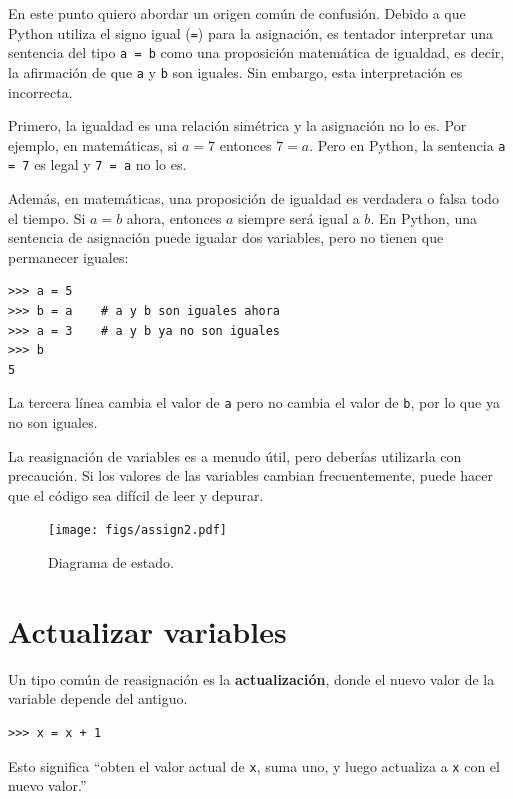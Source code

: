 \documentclass[10pt]{book}
\begin{document}
En este punto quiero abordar un origen común de
confusión.
Debido a que Python utiliza el signo igual ({\tt =}) para la asignación, es
tentador interpretar una sentencia del tipo {\tt a = b} como una
proposición
matemática de igualdad, es decir, la afirmación de que {\tt a} y
{\tt b} son iguales.  Sin embargo, esta interpretación es incorrecta.

Primero, la igualdad es una relación simétrica y la asignación no lo es.  Por
ejemplo, en matemáticas, si $a=7$ entonces $7=a$.  Pero en Python, la
sentencia {\tt a = 7} es legal y {\tt 7 = a} no lo es.

Además, en matemáticas, una proposición de igualdad es verdadera o
falsa todo el tiempo.  Si $a=b$ ahora, entonces $a$ siempre será igual a $b$.
En Python, una sentencia de asignación puede igualar dos variables, pero
no tienen que permanecer iguales:

\begin{verbatim}
>>> a = 5
>>> b = a    # a y b son iguales ahora
>>> a = 3    # a y b ya no son iguales
>>> b
5
\end{verbatim}
%
La tercera línea cambia el valor de {\tt a} pero no cambia el
valor de {\tt b}, por lo que ya no son iguales.

La reasignación de variables es a menudo útil, pero deberías utilizarla
con precaución.  Si los valores de las variables cambian frecuentemente, puede
hacer que el código sea difícil de leer y depurar.

\begin{figure}
\centerline
{\texttt{[image: figs/assign2.pdf]}}
\caption{Diagrama de estado.}
\label{fig.assign2}
\end{figure}



\section{Actualizar variables}
\label{update}


Un tipo común de reasignación es la {\bf actualización},
donde el nuevo valor de la variable depende del antiguo.

\begin{verbatim}
>>> x = x + 1
\end{verbatim}
%
Esto significa ``obten el valor actual de {\tt x}, suma uno, y luego
actualiza a {\tt x} con el nuevo valor.''
\end{document}
